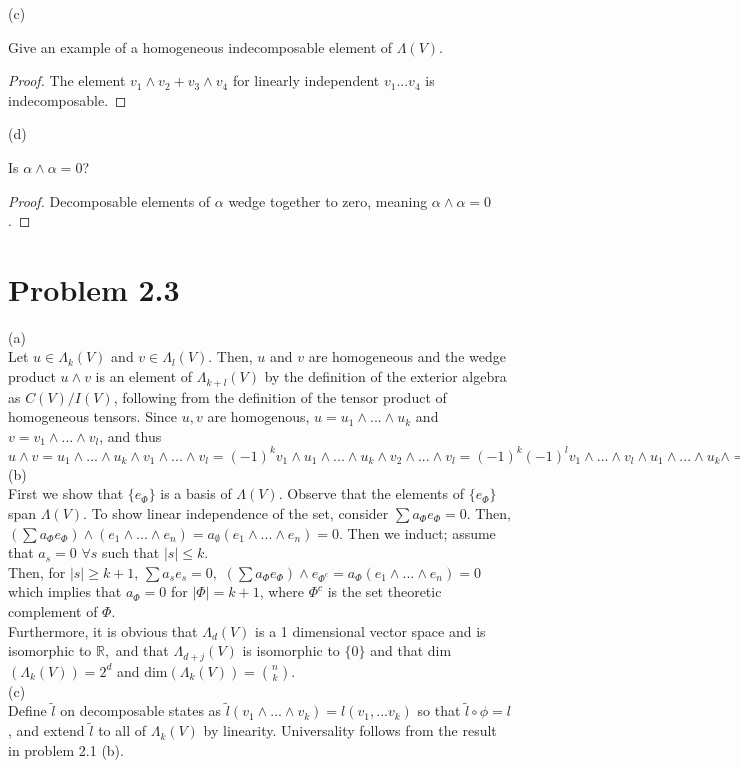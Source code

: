 \documentclass[paper=a4, fontsize=11pt]{scrartcl} %
\numberwithin{equation}{section} %
\numberwithin{figure}{section} %
\numberwithin{table}{section} %
\begin{document}
(c)

Give an example of a homogeneous indecomposable element of $\Lambda(V)$.

\begin{proof}
The element $v_1 \wedge v_2 + v_3 \wedge v_4$ for linearly independent $v_1...v_4$ is indecomposable.
\end{proof}

(d)

Is $\alpha \wedge \alpha = 0$?

\begin{proof}
Decomposable elements of $\alpha$ wedge together to zero, meaning $\alpha \wedge \alpha = 0$.
\end{proof}

\section*{Problem 2.3}

(a) \\ Let $u \in \Lambda_k (V)$ and $v \in \Lambda_l (V)$. Then, $u$ and $v$ are homogeneous and the wedge product $u \wedge v$ is an element of $\Lambda_{k+l} (V)$ by the definition of the exterior algebra as $C(V)/I(V)$, following from the definition of the tensor product of homogeneous tensors. Since $u,v$ are homogenous, $u = u_1 \wedge ...\wedge u_k$ and $v = v_1 \wedge ...\wedge v_l$, and thus $u \wedge v = u_1 \wedge ...\wedge u_k \wedge v_1 \wedge ...\wedge v_l = (-1)^k v_1 \wedge u_1 \wedge ...\wedge u_k \wedge v_2 \wedge ...\wedge v_l = (-1)^k (-1)^l v_1 \wedge ...\wedge v_l \wedge u_1 \wedge ...\wedge u_k \wedge = (-1)^{kl} v \wedge u$ \\

(b) \\ First we show that $\{e_{\Phi}\}$ is a basis of $\Lambda(V)$. Observe that the elements of $\{e_{\Phi}\}$ span $\Lambda(V)$. To show linear independence of the set, consider $\sum a_\Phi e_\Phi = 0$. Then, $(\sum a_\Phi e_\Phi) \wedge (e_1 \wedge ... \wedge e_n) = a_{\emptyset}(e_1 \wedge ... \wedge e_n) = 0.$ Then we induct; assume that $a_s = 0$ $\forall s$ such that $|s| \leq k$. \\
Then, for $|s| \geq k+1$,  $\sum a_s e_s = 0, $  $(\sum a_\Phi e_\Phi) \wedge e_{\Phi^c} = a_{\Phi}(e_1 \wedge ...\wedge e_n) = 0$ which implies that $a_\Phi = 0$ for $|\Phi| = k+1$, where $\Phi^c$ is the set theoretic complement of $\Phi$. \\

Furthermore, it is obvious that $\Lambda_d(V)$ is a 1 dimensional vector space and is isomorphic to $\mathbb{R},$ and that $\Lambda_{d+j}(V)$ is isomorphic to $\{0\}$ and that dim$(\Lambda_k(V)) = 2^d$ and dim$(\Lambda_k(V)) = {n \choose k}$. \\

(c) \\ Define $\widetilde{l}$ on decomposable states as $\widetilde{l}(v_1 \wedge ... \wedge v_k) = l(v_1,...v_k)$ so that $\widetilde{l} \circ \phi = l$, and extend $\widetilde{l}$ to all of $\Lambda_k (V)$ by linearity. Universality follows from the result in problem 2.1 (b).
\end{document}
